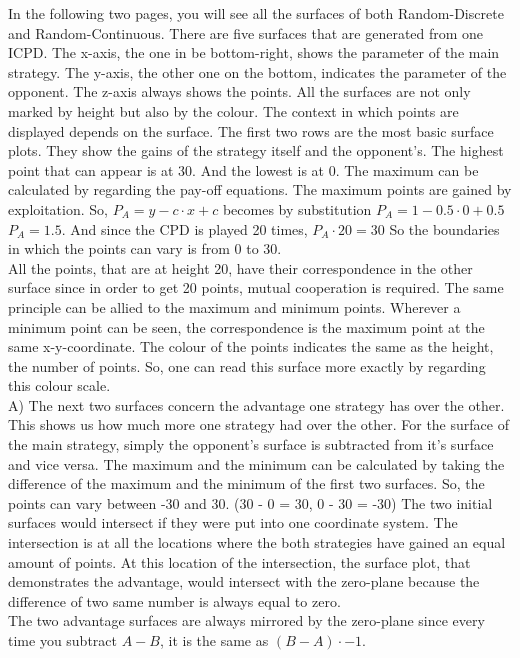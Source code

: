 \documentclass{article}
\begin{document}
In the following two pages, you will see all the surfaces of both Random-Discrete and Random-Continuous.
There are five surfaces that are generated from one ICPD.
The x-axis, the one in be bottom-right, shows the parameter of the main strategy.
The y-axis, the other one on the bottom, indicates the parameter of the opponent.
The z-axis always shows the points.
All the surfaces are not only marked by height but also by the colour.
The context in which points are displayed depends on the surface. 
The first two rows are the most basic surface plots.
They show the gains of the strategy itself and the opponent's.
The highest point that can appear is at 30.
And the lowest is at 0.
The maximum can be calculated by regarding the pay-off equations.
The maximum points are gained by exploitation.
So, $P_A =  y - c \cdot x + c$ becomes by substitution $P_A = 1 - 0.5 \cdot 0 + 0.5$ \textrightarrow $P_A = 1.5$.
And since the CPD is played 20 times, $P_A \cdot 20 = 30$
So the boundaries in which the points can vary is from 0 to 30.\\
All the points, that are at height 20, have their correspondence in the other surface since in order to get 20 points, mutual cooperation is required.
The same principle can be allied to the maximum and minimum points.
Wherever a minimum point can be seen, the correspondence is the maximum point at the same x-y-coordinate.
The colour of the points indicates the same as the height, the number of points.
So, one can read this surface more exactly by regarding this colour scale.\\
A)
The next two surfaces concern the advantage one strategy has over the other.
This shows us how much more one strategy had over the other.
For the surface of the main strategy, simply the opponent's surface is subtracted from it's surface and vice versa.
The maximum and the minimum can be calculated by taking the difference of the maximum and the minimum of the first two surfaces.
So, the points can vary between -30 and 30.
(30 - 0 = 30, 0 - 30 = -30)
The two initial surfaces would intersect if they were put into one coordinate system.
The intersection is at all the locations where the both strategies have gained an equal amount of points.
At this location of the intersection, the surface plot, that demonstrates the advantage, would intersect with the zero-plane because the difference of two same number is always equal to zero.\\
The two advantage surfaces are always mirrored by the zero-plane since every time you subtract $A-B$, it is the same as $(B-A) \cdot -1$.\\
\end{document}
